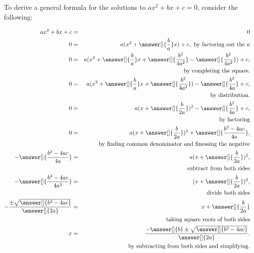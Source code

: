\documentclass{ximera}
\begin{document}
\begin{question}

To derive a general formula for the solutions to $ax^2+bx+c=0$, consider the following:

\begin{eqnarray*}
ax^2+bx+c&=& 0\\
0&=&a(x^2+\answer[]{\frac{b}{a}}x)+c,\ \text{by factoring out the $a$} \\
0&=& a(x^2+\answer[]{\frac{b}{a}}x+\answer[]{\frac{b^2}{4a^2}}-\answer[]{\frac{b^2}{4a^2}})+c, \\ 
&&\text{by completing the square.}\\
0&=&a(x^2+\answer[]{\frac{b}{a}}x+\answer[]{\frac{b^2}{4a^2}})-\answer[]{\frac{b^2}{4a}}+c,\\
 && \text{by distribution.}\\
0&=&a(x+\answer[]{\frac{b}{2a}})^2-\answer[]{\frac{b^2}{4a}}+c,\\
&&\text{by factoring}\\
0&=&a(x+\answer[]{\frac{b}{2a}})^2+\answer[]{\frac{b^2-4ac}{4a}},\\
&& \text{by finding common denominator and finessing the negative}\\
-\answer[]{\frac{b^2-4ac}{4a}}&=&a(x+\answer[]{\frac{b}{2a}})^2, \\
&& \text{subtract from both sides}\\
-\answer[]{\frac{b^2-4ac}{4a^2}}&=&(x+\answer[]{\frac{b}{2a}})^2, \\
&& \text{divide both sides}\\
-\frac{\pm \sqrt{\answer[]{b^2-4ac}}}{\answer[]{2a}}&=&x+\answer[]{\frac{b}{2a}}\\
&& \text{taking square roots of both sides}\\
x&=&\frac{-\answer[]{b}\pm \sqrt{\answer[]{b^2-4ac}}}{\answer[]{2a}}.\\
&& \text{by subtracting from both sides and simplifying.}
\end{eqnarray*}


\end{question}


%
%
%
%
%
\end{document}
